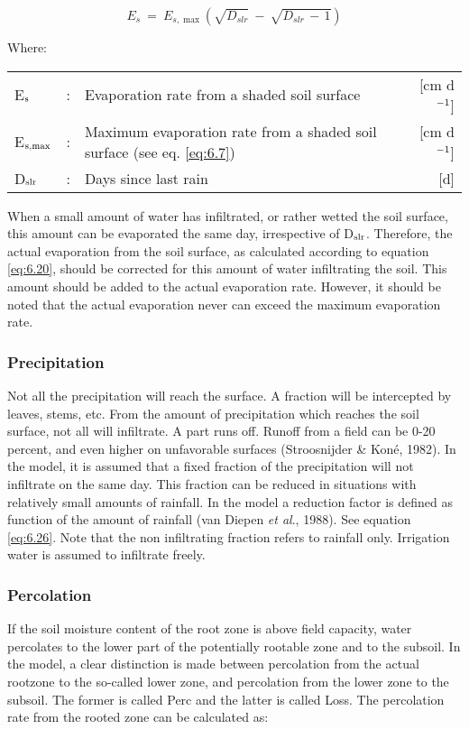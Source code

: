 \begin{equation}
\label{eq:6.20}
E _{s} ~=~ E _{s,\max } ( \sqrt{D _{slr} } ~-~ \sqrt{D _{slr} \, -\, 1} )
\end{equation}

Where:\\[5pt]
\begin{tabularx}{\textwidth}{llXr}
	E$_{{\rm s}}$ &:& Evaporation rate from a shaded soil surface  & [cm d$^{{\rm -1}}$]\\
	E$_{{\rm s,max}}$ &:& Maximum evaporation rate from a shaded soil
	surface (see eq. \ref{eq:6.7})  & [cm d$^{{\rm -1}}$]\\
	D$_{{\rm slr}}$ &:& Days since last rain  & [d]\\
\end{tabularx}

When a small amount of water has infiltrated, or rather wetted the soil surface, this
amount can be evaporated the same day, irrespective of D$_{{\rm slr}}$. Therefore, the actual
evaporation from the soil surface, as calculated according to equation \ref{eq:6.20}, should be
corrected for this amount of water infiltrating the soil. This amount should be added to
the actual evaporation rate. However, it should be noted that the actual evaporation never
can exceed the maximum evaporation rate.

\subsubsection{Precipitation}
Not all the precipitation will reach the surface. A fraction will be intercepted by leaves,
stems, etc. From the amount of precipitation which reaches the soil surface, not all will
infiltrate. A part runs off. Runoff from a field can be 0-20 percent, and even higher on
unfavorable surfaces (Stroosnijder \& Kon\'{e}, 1982). In the model, it is assumed that a
fixed fraction of the precipitation will not infiltrate on the same day. This fraction can be
reduced in situations with relatively small amounts of rainfall. In the model a reduction
factor is defined as function of the amount of rainfall (van Diepen {\it et al}., 1988). See 
equation \ref{eq:6.26}. Note that the non infiltrating 
fraction refers to rainfall only. Irrigation water is assumed to infiltrate freely.

\subsubsection{Percolation}
If the soil moisture content of the root zone is above field capacity, water percolates to
the lower part of the potentially rootable zone and to the subsoil. In the model, a clear
distinction is made between percolation from the actual rootzone to the so-called lower
zone, and percolation from the lower zone to the subsoil. The former is called Perc and
the latter is called Loss. The percolation rate from the rooted zone can be calculated as:

